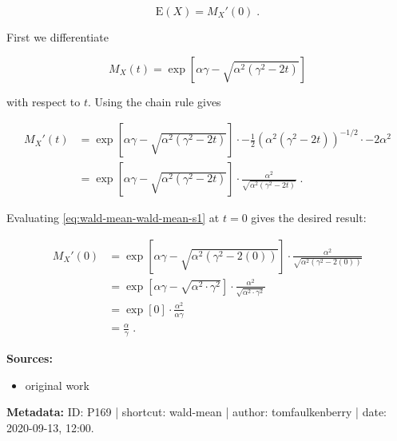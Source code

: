 \documentclass[a4paper,12pt,twoside]{book}
\begin{document}
\begin{equation} \label{eq:wald-mean-wald-moment}
\mathrm{E}(X) = M_X'(0) \; .
\end{equation}

First we differentiate

\begin{equation} \label{eq:wald-mean-wald-mgf}
M_X(t) = \exp\left[\alpha \gamma - \sqrt{\alpha^2(\gamma^2-2t)}\right]
\end{equation}

with respect to $t$. Using the chain rule gives

\begin{equation} \label{eq:wald-mean-wald-mean-s1}
\begin{split}
  M_X'(t) &= \exp\left[\alpha \gamma - \sqrt{\alpha^2(\gamma^2-2t)}\right] \cdot -\frac{1}{2}\left(\alpha^2(\gamma^2-2t)\right)^{-1/2}\cdot -2\alpha^2 \\
  &= \exp\left[\alpha \gamma-\sqrt{\alpha^2(\gamma^2-2t)}\right] \cdot \frac{\alpha^2}{\sqrt{\alpha^2(\gamma^2-2t)}} \; .
\end{split}
\end{equation}

Evaluating \eqref{eq:wald-mean-wald-mean-s1} at $t=0$ gives the desired result:

\begin{equation} \label{eq:wald-mean-wald-mean-s2}
\begin{split}
  M_X'(0) &= \exp\left[\alpha \gamma-\sqrt{\alpha^2(\gamma^2-2(0))}\right] \cdot \frac{\alpha^2}{\sqrt{\alpha^2(\gamma^2-2(0))}} \\
          &= \exp\left[\alpha \gamma - \sqrt{\alpha^2 \cdot \gamma^2}\right]\cdot \frac{\alpha^2}{\sqrt{\alpha^2\cdot \gamma^2}} \\
          &= \exp[0] \cdot \frac{\alpha^2}{\alpha \gamma} \\
          &= \frac{\alpha}{\gamma} \; .
\end{split}
\end{equation}


\vspace{1em}
\textbf{Sources:}
\begin{itemize}
\item original work\end{itemize}


\vspace{1em}
\textbf{Metadata:} ID: P169 | shortcut: wald-mean | author: tomfaulkenberry | date: 2020-09-13, 12:00.
\vspace{1em}
\end{document}

